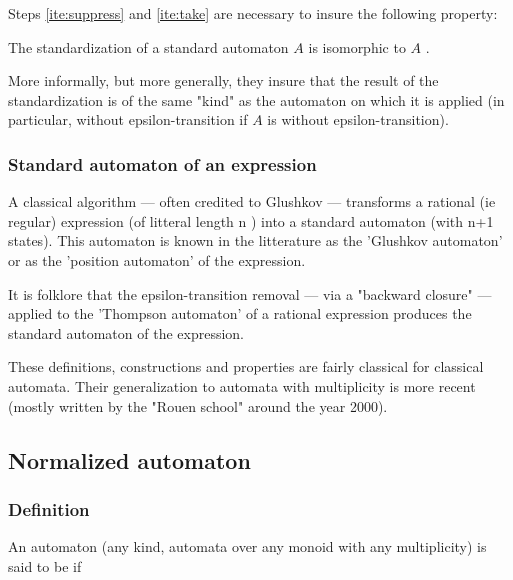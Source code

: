 \begin{remark}
  Steps \autoref{ite:suppress} and \autoref{ite:take} are necessary to
  insure the following property:

  The standardization of a standard automaton $A$ is isomorphic to $A$ .

  More informally, but more generally, they insure that the result of
  the standardization is of the same "kind" as the automaton on which
  it is applied (in particular, without epsilon-transition if $A$ is
  without epsilon-transition).
\end{remark}



\subsubsection{Standard automaton of an expression}

A classical algorithm --- often credited to Glushkov --- transforms a
rational (ie regular) expression (of litteral length n ) into a
standard automaton (with n+1 states). This automaton is known in the
litterature as the 'Glushkov automaton' or as the 'position automaton'
of the expression.

\begin{remark}
  It is folklore that the epsilon-transition removal --- via a
  "backward closure" --- applied to the 'Thompson automaton' of a
  rational expression produces the standard automaton of the
  expression.
\end{remark}

\begin{remark}
  These definitions, constructions and properties are fairly classical
  for classical automata. Their generalization to automata with
  multiplicity is more recent (mostly written by the "Rouen school"
  around the year 2000).
\end{remark}

\subsection{Normalized automaton}

\subsubsection{Definition}


An automaton (any kind, automata over any monoid with any
multiplicity) is said to be  if


